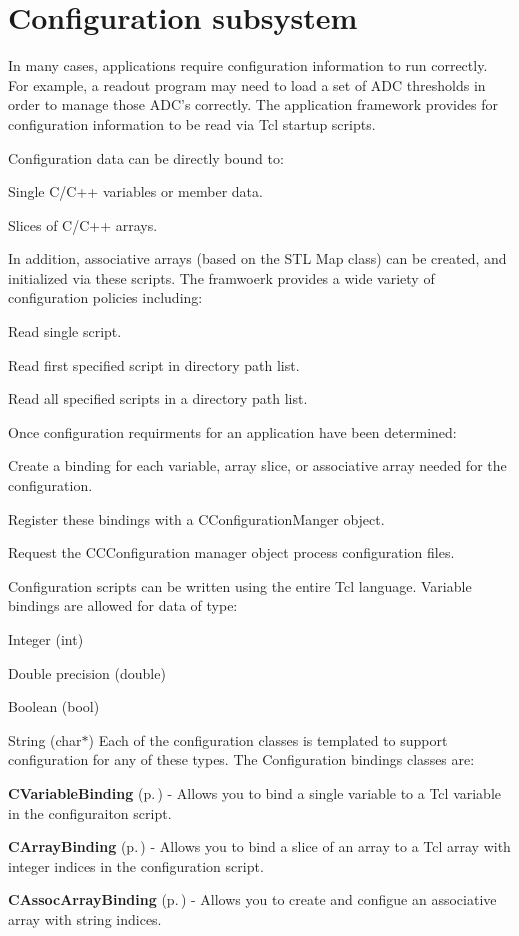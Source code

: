 \section{Configuration subsystem}\label{configsys}


In many cases, applications require configuration information to run correctly. For example, a readout program may need to load a set of ADC thresholds in order to manage those ADC's correctly. The application framework provides  for configuration information to be read via Tcl startup scripts.

Configuration data can be directly bound to:\begin{CompactItemize}
\item 
Single C/C++ variables or member data.\item 
Slices of C/C++ arrays.\end{CompactItemize}
In addition, associative arrays (based on the STL Map class) can be created, and initialized via these scripts. The framwoerk provides a wide variety of  configuration policies including:\begin{CompactItemize}
\item 
Read single script.\item 
Read first specified script in directory path list.\item 
Read all specified scripts in a directory path list.\end{CompactItemize}
Once configuration requirments for an application have been determined:\begin{CompactItemize}
\item 
Create a binding for each variable, array slice, or associative array needed for the configuration.\item 
Register these bindings with a CConfiguration\-Manger object.\item 
Request the CCConfiguration manager object process configuration files.\end{CompactItemize}
Configuration scripts can be written using the entire Tcl language. Variable bindings are allowed for data of type:\begin{CompactItemize}
\item 
Integer (int)\item 
Double precision (double)\item 
Boolean (bool)\item 
String (char$\ast$) Each of the configuration classes is templated to support configuration for any of these types. The Configuration bindings classes are:\item 
{\bf CVariable\-Binding} {\rm (p.\,\pageref{classCVariableBinding})} - Allows you to bind a single variable to a Tcl variable in the configuraiton script.\item 
{\bf CArray\-Binding} {\rm (p.\,\pageref{classCArrayBinding})} - Allows you to bind a slice of an array to a Tcl array with integer indices in the configuration script.\item 
{\bf CAssoc\-Array\-Binding} {\rm (p.\,\pageref{classCAssocArrayBinding})} - Allows you to create and configue an associative array with string indices.\end{CompactItemize}
